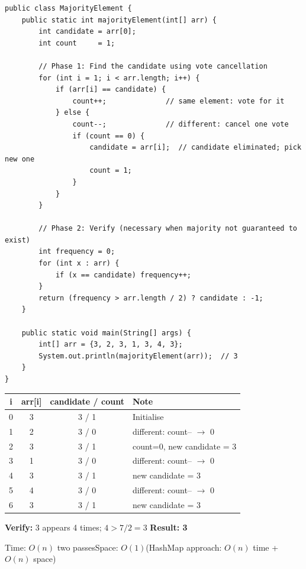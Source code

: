 \documentclass[12pt,a4paper,oneside]{book}
\begin{document}
\begin{lstlisting}[caption={Boyer-Moore Voting Algorithm}]
public class MajorityElement {
    public static int majorityElement(int[] arr) {
        int candidate = arr[0];
        int count     = 1;

        // Phase 1: Find the candidate using vote cancellation
        for (int i = 1; i < arr.length; i++) {
            if (arr[i] == candidate) {
                count++;              // same element: vote for it
            } else {
                count--;              // different: cancel one vote
                if (count == 0) {
                    candidate = arr[i];  // candidate eliminated; pick new one
                    count = 1;
                }
            }
        }

        // Phase 2: Verify (necessary when majority not guaranteed to exist)
        int frequency = 0;
        for (int x : arr) {
            if (x == candidate) frequency++;
        }
        return (frequency > arr.length / 2) ? candidate : -1;
    }

    public static void main(String[] args) {
        int[] arr = {3, 2, 3, 1, 3, 4, 3};
        System.out.println(majorityElement(arr));  // 3
    }
}
\end{lstlisting}

\begin{dryrun}[Dry Run: arr = \{3, 2, 3, 1, 3, 4, 3\}]
\begin{center}
\begin{tabular}{cccl}
\toprule
\textbf{i} & \textbf{arr[i]} & \textbf{candidate / count} & \textbf{Note}\\
\midrule
0 & 3 & 3 / 1 & Initialise\\
1 & 2 & 3 / 0 & different: count-- $\to$ 0\\
2 & 3 & 3 / 1 & count=0, new candidate = 3\\
3 & 1 & 3 / 0 & different: count-- $\to$ 0\\
4 & 3 & 3 / 1 & new candidate = 3\\
5 & 4 & 3 / 0 & different: count-- $\to$ 0\\
6 & 3 & 3 / 1 & new candidate = 3\\
\bottomrule
\end{tabular}
\end{center}
\textbf{Verify:} 3 appears 4 times; $4 > 7/2 = 3$ \checkmark \quad \textbf{Result: 3}
\end{dryrun}

\begin{complexity}
Time: $O(n)$ two passes\quad Space: $O(1)$\quad (HashMap approach: $O(n)$ time + $O(n)$ space)
\end{complexity}
\end{document}
